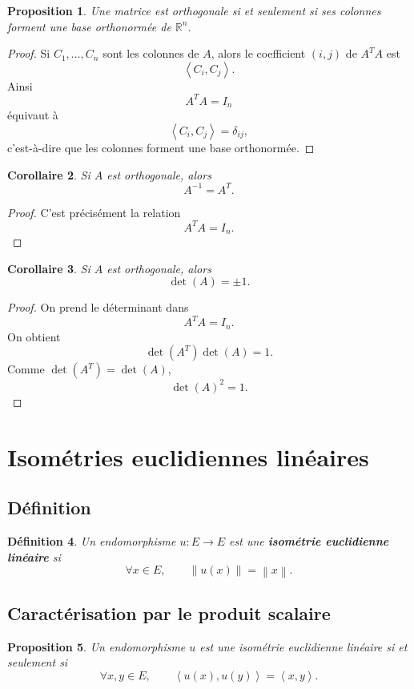 \documentclass[11pt,a4paper]{article}
\newtheorem{definition}{Définition}[section]
\newtheorem{proposition}[definition]{Proposition}
\newtheorem{corollaire}[definition]{Corollaire}
\theoremstyle{remark}
\newcommand{\R}{\mathbb{R}}
\newcommand{\Norm}[1]{\left\|#1\right\|}
\newcommand{\scal}[2]{\left\langle #1,#2\right\rangle}
\begin{document}
\begin{proposition}
Une matrice est orthogonale si et seulement si ses colonnes forment une base orthonormée de \(\R^n\).
\end{proposition}

\begin{proof}
Si \(C_1,\dots,C_n\) sont les colonnes de \(A\), alors le coefficient \((i,j)\) de \(A^TA\) est
\[
\scal{C_i}{C_j}.
\]
Ainsi
\[
A^TA=I_n
\]
équivaut à
\[
\scal{C_i}{C_j}=\delta_{ij},
\]
c’est-à-dire que les colonnes forment une base orthonormée.
\end{proof}

\begin{corollaire}
Si \(A\) est orthogonale, alors
\[
A^{-1}=A^T.
\]
\end{corollaire}

\begin{proof}
C’est précisément la relation
\[
A^TA=I_n.
\]
\end{proof}

\begin{corollaire}
Si \(A\) est orthogonale, alors
\[
\det(A)=\pm 1.
\]
\end{corollaire}

\begin{proof}
On prend le déterminant dans
\[
A^TA=I_n.
\]
On obtient
\[
\det(A^T)\det(A)=1.
\]
Comme \(\det(A^T)=\det(A)\),
\[
\det(A)^2=1.
\]
\end{proof}

\section{Isométries euclidiennes linéaires}

\subsection{Définition}

\begin{definition}
Un endomorphisme \(u:E\to E\) est une \textbf{isométrie euclidienne linéaire} si
\[
\forall x\in E,\qquad \Norm{u(x)}=\Norm{x}.
\]
\end{definition}

\subsection{Caractérisation par le produit scalaire}

\begin{proposition}
Un endomorphisme \(u\) est une isométrie euclidienne linéaire si et seulement si
\[
\forall x,y\in E,\qquad \scal{u(x)}{u(y)}=\scal{x}{y}.
\]
\end{proposition}
\end{document}
